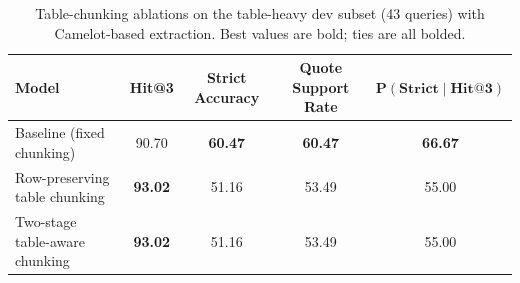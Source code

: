 \begin{table}[t]
\centering
\small
\setlength{\tabcolsep}{6pt}
\caption{Table-chunking ablations on the table-heavy dev subset (43 queries) with Camelot-based extraction. Best values are bold; ties are all bolded.}
\label{tab:table_chunking_ablation_tableheavy_camelot_rag_style}
\begin{tabular}{lcccc}
\toprule
\textbf{Model} &
\textbf{Hit@3} &
\textbf{Strict Accuracy} &
\textbf{Quote Support Rate} &
$\mathbf{P(\text{Strict} \mid \text{Hit@3})}$ \\
\midrule
Baseline (fixed chunking)                & 90.70          & \textbf{60.47} & \textbf{60.47} & \textbf{66.67} \\
Row-preserving table chunking            & \textbf{93.02} & 51.16          & 53.49          & 55.00          \\
Two-stage table-aware chunking           & \textbf{93.02} & 51.16          & 53.49          & 55.00          \\
\bottomrule
\end{tabular}
\end{table}

